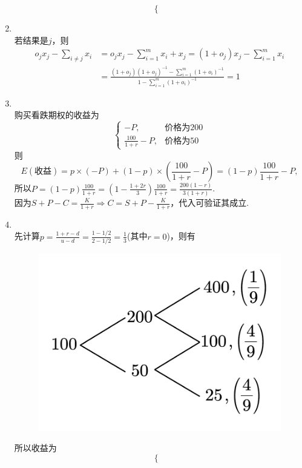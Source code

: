 \begin{enumerate}[label=\arabic{section}.\arabic*]
\[\begin{cases}
    \end{cases}\]
    \item \pro\\
    若结果是$j$，则
    \begin{align*}
        o_jx_j-\sum_{i \neq j}x_i & = o_jx_j-\sum_{i = 1}^m x_i+x_j=(1+o_j)x_j-\sum_{i = 1}^m x_i\\
        &=\frac{(1+o_j)(1+o_j)^{-1}-\sum\limits_{i=1}^m (1+o_i)^{-1}}{1-\sum\limits_{i=1}^m (1+o_i)^{-1}}=1
    \end{align*}
    \item \sol\\
    购买看跌期权的收益为
    \[\begin{cases}
        -P, & \text{价格为}200 \\ \displaystyle\frac{100}{1+r}-P, & \text{价格为}50
    \end{cases}\]
    则\[E(\text{收益})=p\times(-P)+(1-p)\times\left(\frac{100}{1+r}-P\right)=(1-p)\frac{100}{1+r}-P,\]
    所以$\displaystyle P=(1-p)\frac{100}{1+r}=\left(1-\frac{1+2r}{3}\right)\frac{100}{1+r}=\frac{200(1-r)}{3(1+r)}$.\\
    因为$\displaystyle S+P-C=\frac{K}{1+r} \Rightarrow C=S+P-\frac{K}{1+r}$，代入可验证其成立.
    \item \sol\\
    先计算$\displaystyle p=\frac{1+r-d}{u-d}=\frac{1-1/2}{2-1/2}=\frac{1}{3}$(其中$r=0$)，则有
    \begin{figure}[H]
        \centering
        \includegraphics[scale=0.3]{6.7.pdf}
    \end{figure}
    所以收益为\[\begin{cases}

\end{cases}\]
\end{enumerate}
